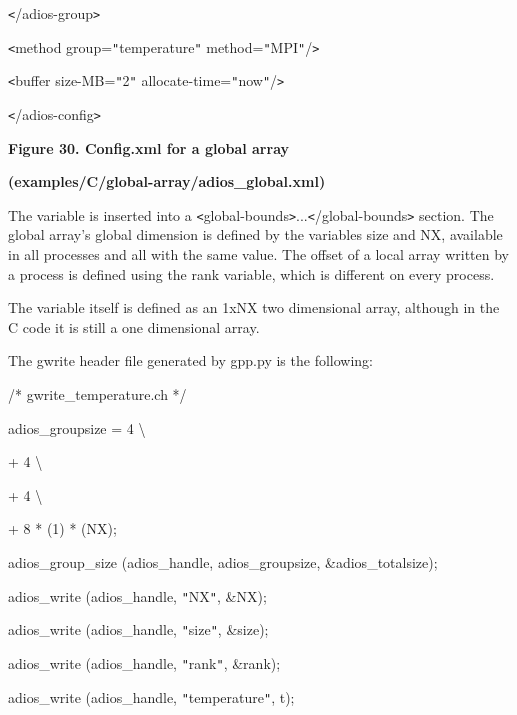 \parindent=14pt
\texttt{<}/adios-group\texttt{>}

\parindent=0pt
\texttt{<}method group=\texttt{"}temperature\texttt{"} method=\texttt{"}MPI\texttt{"}/\texttt{>}

\texttt{<}buffer size-MB=\texttt{"}2\texttt{"} allocate-time=\texttt{"}now\texttt{"}/\texttt{>}

\texttt{<}/adios-config\texttt{>} 

\label{HRef119581446}\label{HToc144350189}

\begin{center}
{\color{color20} \textbf{Figure 30. Config.xml for a global array }}

{\color{color20} \textbf{(examples/C/global-array/adios\_global.xml)\label{HToc212017568}\label{HToc212017704}}}
\end{center}

The variable is inserted into a \texttt{<}global-bounds\texttt{>}...\texttt{<}/global-bounds\texttt{>} 
section. The global array's global dimension is defined by the variables size and 
NX, available in all processes and all with the same value. The offset of a local 
array written by a process is defined using the rank variable, which is different 
on every process.

The variable itself is defined as an 1xNX two dimensional array, although in the 
C code it is still a one dimensional array. 

The gwrite header file generated by gpp.py is the following:

/* gwrite\_temperature.ch */

adios\_groupsize = 4 \textbackslash{}

\parindent=115pt
+ 4 \textbackslash{}

+ 4 \textbackslash{}

\parindent=230pt
+ 8 * (1) * (NX);

\parindent=0pt
adios\_group\_size (adios\_handle, adios\_groupsize, \&adios\_totalsize);

adios\_write (adios\_handle, \texttt{"}NX\texttt{"}, \&NX);

{\color{color02} adios\_write (adios\_handle, \texttt{"}size\texttt{"}, \&size);}

{\color{color02} adios\_write (adios\_handle, \texttt{"}rank\texttt{"}, \&rank);}

adios\_write (adios\_handle, \texttt{"}temperature\texttt{"}, t);

\label{HToc144350190}

